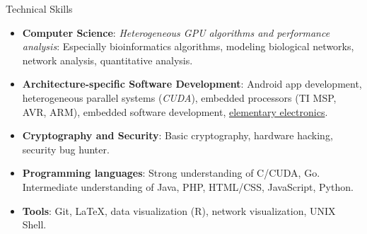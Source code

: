 \documentclass[11pt,oneside]{article}
\newenvironment{ressection}[1]{
	\vspace{4pt}
	{\textbf\selectfont\Large\fontspec{Roboto-Thin.ttf}\textcolor{Sepia}{#1}}
	\begin{itemize}[topsep=6pt]
	\vspace{0pt}
}{
	\end{itemize}
}
\newcommand{\resitem}[1]{
	\vspace{-4pt}
	\item \begin{flushleft} #1 \end{flushleft}
}
\newenvironment{reslist}[1]{
	\resitem{\textbf{#1}}
	\vspace{-5pt}
	\begin{itemize}
}{
	\end{itemize}
}
\begin{document}







\begin{ressection}{Technical Skills}
		
        \resitem{\textbf{Computer Science}: \textit{Heterogeneous GPU algorithms and performance analysis}: Especially bioinformatics algorithms, modeling biological networks, network analysis, quantitative analysis.}

        \resitem{\textbf{Architecture-specific Software Development}: Android app development, heterogeneous parallel systems (\textit{CUDA}), embedded processors (TI MSP, AVR, ARM), embedded software development, \href{https://verify.edxonline.org/cert/e8322a7ae5cb463496f1ab2414c19596}{elementary electronics}.}
	
	    \resitem{\textbf{Cryptography and Security}: Basic  cryptography, hardware hacking, security bug hunter.}
	

		\resitem{\textbf{Programming languages}: Strong understanding of C/CUDA, Go. Intermediate understanding of Java, PHP, HTML/CSS, JavaScript, Python.}
		
		\resitem{\textbf{Tools}: Git, LaTeX, data visualization (R), network visualization, UNIX Shell.}

		

\end{ressection}
\vspace{8 pt}
\end{document}
